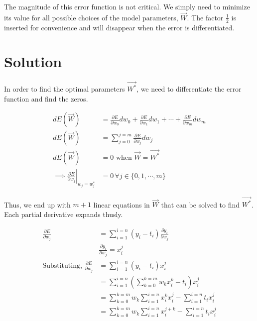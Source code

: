 \documentclass{article}
\begin{document}
The magnitude of this error function is not critical.
We simply need to minimize its value for all possible choices of the model parameters, \(\vec{W}\).
The factor \(\frac{1}{2}\) is inserted for convenience and will disappear when the error is differentiated.

\section{Solution}

In order to find the optimal parameters \(\vec{W^*}\), we need to differentiate the error function and find the zeros.

\begin{align}
    dE(\vec{W}) & = \frac{\partial{E}}{\partial{w_0}}dw_0 + \frac{\partial{E}}{\partial{w_1}}dw_1 + \cdots + \frac{\partial{E}}{\partial{w_m}}dw_m  \\
    dE(\vec{W}) & = \sum_{j=0}^{j=m}{\frac{\partial{E}}{\partial{w_j}}dw_j}                                                                         \\
    dE(\vec{W}) & = 0 \text{ when } \vec{W} = \vec{W^*}                                                                                             \\
    \implies \left.\frac{\partial{E}}{\partial{w_j}}\right|_{w_j=w_j^*} & = 0 \,\forall j \in \{0, 1, \cdots, m\}
\end{align}

Thus, we end up with \(m+1\) linear equations in \(\vec{W}\) that can be solved to find \(\vec{W^*}\).
Each partial derivative expands thusly.

\begin{align}
    \frac{\partial{E}}{\partial{w_j}}                       & = \sum_{i=1}^{i=n}{(y_i - t_i)}\frac{\partial{y_i}}{\partial{w_j}}                \\
                                                            & \frac{\partial{y_i}}{\partial{w_j}} = x_i^j                                       \\
    \text{Substituting, } \frac{\partial{E}}{\partial{w_j}} & = \sum_{i=1}^{i=n}{(y_i - t_i)x_i^j}                                              \\
                                                            & = \sum_{i=1}^{i=n}{(\sum_{k=0}^{k=m}{w_kx_i^k} - t_i)x_i^j}                       \\
                                                            & = \sum_{k=0}^{k=m}{w_k\sum_{i=1}^{i=n}{x_i^k}x_i^j - \sum_{i=1}^{i=n}{t_i}x_i^j}  \\
                                                            & = \sum_{k=0}^{k=m}{w_k\sum_{i=1}^{i=n}{x_i^{j+k}} - \sum_{i=1}^{i=n}{t_i}x_i^j}
\end{align}
\end{document}
